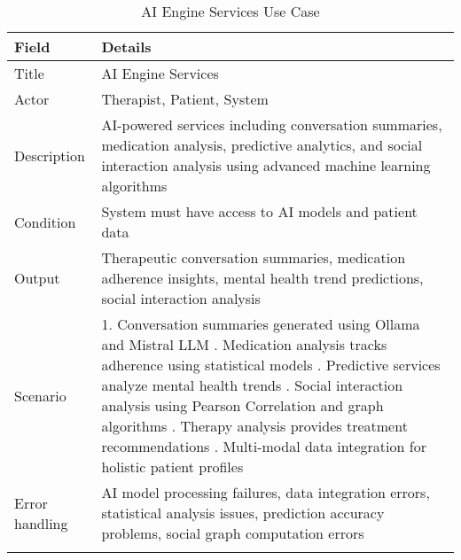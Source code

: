 \begin{longtable}{|p{3cm}|p{12cm}|}
\hline
\textbf{Field} & \textbf{Details} \\
\hline
Title & AI Engine Services \\
\hline
Actor & Therapist, Patient, System \\
\hline
Description & AI-powered services including conversation summaries, medication analysis, predictive analytics, and social interaction analysis using advanced machine learning algorithms \\
\hline
Condition & System must have access to AI models and patient data \\
\hline
Output & Therapeutic conversation summaries, medication adherence insights, mental health trend predictions, social interaction analysis \\
\hline
Scenario & 1. Conversation summaries generated using Ollama and Mistral LLM \newline 2. Medication analysis tracks adherence using statistical models \newline 3. Predictive services analyze mental health trends \newline 4. Social interaction analysis using Pearson Correlation and graph algorithms \newline 5. Therapy analysis provides treatment recommendations \newline 6. Multi-modal data integration for holistic patient profiles \\
\hline
Error handling & AI model processing failures, data integration errors, statistical analysis issues, prediction accuracy problems, social graph computation errors \\
\hline
\caption{AI Engine Services Use Case}
\end{longtable}

